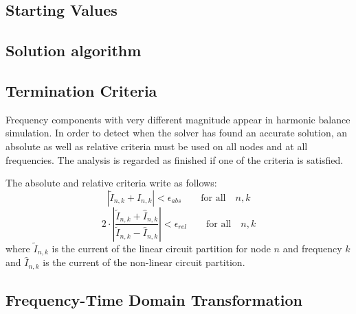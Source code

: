 \subsection{Starting Values}


\subsection{Solution algorithm}



\subsection{Termination Criteria}

Frequency components with very different magnitude appear in harmonic
balance simulation. In order to detect when the solver has found an
accurate solution, an absolute as well as relative criteria must be
used on all nodes and at all frequencies. The analysis is regarded as
finished if one of the criteria is satisfied.

\addvspace{12pt}

The absolute and relative criteria write as follows:
\begin{equation}
\left| \tilde{I}_{n,k} + \hat{I}_{n,k} \right| < \epsilon_{abs}
  \qquad \text{for all} \quad n, k
\end{equation}
\begin{equation}
2\cdot \left| \frac{\tilde{I}_{n,k} + \hat{I}_{n,k}}
                   {\tilde{I}_{n,k} - \hat{I}_{n,k}} \right|
  < \epsilon_{rel}  \qquad \text{for all} \quad n, k
\end{equation}
where $\tilde{I}_{n,k}$ is the current of the linear circuit
partition for node $n$ and frequency $k$ and $\hat{I}_{n,k}$
is the current of the non-linear circuit partition.


\subsection{Frequency-Time Domain Transformation}

